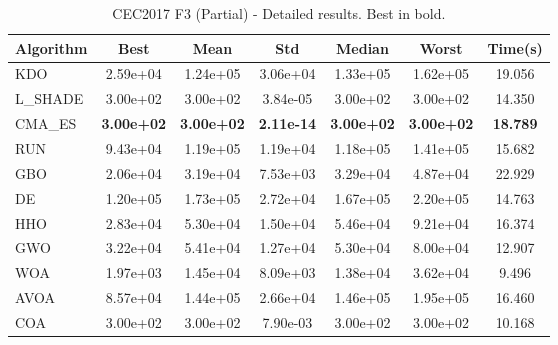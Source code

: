 \begin{table}[H]
\centering\small
\caption{CEC2017 F3 (Partial) - Detailed results. Best in bold.}
\label{tab:cec2017_F3}
\begin{tabular}{lcccccc}
\toprule
\textbf{Algorithm} & \textbf{Best} & \textbf{Mean} & \textbf{Std} & \textbf{Median} & \textbf{Worst} & \textbf{Time(s)} \\
\midrule
KDO & 2.59e+04 & 1.24e+05 & 3.06e+04 & 1.33e+05 & 1.62e+05 & 19.056 \\
L_SHADE & 3.00e+02 & 3.00e+02 & 3.84e-05 & 3.00e+02 & 3.00e+02 & 14.350 \\
CMA_ES & \textbf{3.00e+02} & \textbf{3.00e+02} & \textbf{2.11e-14} & \textbf{3.00e+02} & \textbf{3.00e+02} & \textbf{18.789} \\
RUN & 9.43e+04 & 1.19e+05 & 1.19e+04 & 1.18e+05 & 1.41e+05 & 15.682 \\
GBO & 2.06e+04 & 3.19e+04 & 7.53e+03 & 3.29e+04 & 4.87e+04 & 22.929 \\
DE & 1.20e+05 & 1.73e+05 & 2.72e+04 & 1.67e+05 & 2.20e+05 & 14.763 \\
HHO & 2.83e+04 & 5.30e+04 & 1.50e+04 & 5.46e+04 & 9.21e+04 & 16.374 \\
GWO & 3.22e+04 & 5.41e+04 & 1.27e+04 & 5.30e+04 & 8.00e+04 & 12.907 \\
WOA & 1.97e+03 & 1.45e+04 & 8.09e+03 & 1.38e+04 & 3.62e+04 & 9.496 \\
AVOA & 8.57e+04 & 1.44e+05 & 2.66e+04 & 1.46e+05 & 1.95e+05 & 16.460 \\
COA & 3.00e+02 & 3.00e+02 & 7.90e-03 & 3.00e+02 & 3.00e+02 & 10.168 \\
\bottomrule
\end{tabular}
\end{table}
